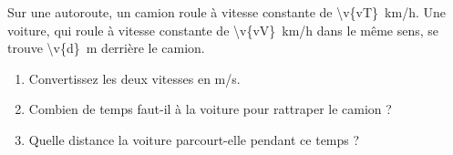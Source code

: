 Sur une autoroute, un camion roule à vitesse constante de \qty{\v{vT}}{km/h}. Une voiture, qui roule à vitesse constante de \qty{\v{vV}}{km/h} dans le même sens, se trouve \qty{\v{d}}{m} derrière le camion.

\begin{enumerate}[label=\alph*)]
    \item Convertissez les deux vitesses en m/s.
    \item Combien de temps faut-il à la voiture pour rattraper le camion ?
    \item Quelle distance la voiture parcourt-elle pendant ce temps ?
\end{enumerate}
